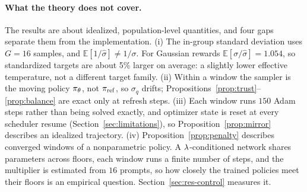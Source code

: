 \paragraph{What the theory does not cover.}
The results are about idealized, population-level quantities, and four gaps
separate them from the implementation.
(i) The in-group standard deviation uses $G = 16$ samples, and
$\mathbb{E}[1/\hat\sigma] \ne 1/\sigma$. For Gaussian rewards
$\mathbb{E}[\sigma/\hat\sigma] = 1.054$, so standardized targets are about 5\%
larger on average: a slightly lower effective temperature, not a different
target family.
(ii) Within a window the sampler is the moving policy $\pi_\theta$, not $\pi_{\mathrm{ref}}$,
so $\sigma_q$ drifts; Propositions~\ref{prop:trust}--\ref{prop:balance} are
exact only at refresh steps.
(iii) Each window runs $150$ Adam steps rather than being solved exactly, and
optimizer state is reset at every scheduler resume (Section~\ref{sec:limitations}),
so Proposition~\ref{prop:mirror} describes an idealized trajectory.
(iv) Proposition~\ref{prop:penalty} describes converged windows of a
nonparametric policy. A $\lambda$-conditioned network shares parameters across
floors, each window runs a finite number of steps, and the multiplier is
estimated from $16$ prompts, so how closely the trained policies meet their
floors is an empirical question. Section~\ref{sec:res-control} measures it.
